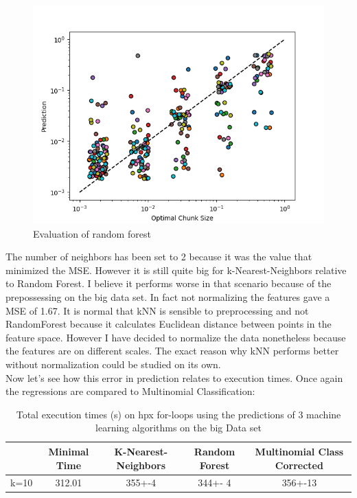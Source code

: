 \begin{figure}[H]
	\centering
	\includegraphics[width=120mm]{images/RFR_eval_big.png}
	\caption{Evaluation of random forest}
\end{figure}

The number of neighbors has been set to 2 because it was the value that minimized the MSE. However it is still quite big for k-Nearest-Neighbors relative to Random Forest. I believe it performs worse in that scenario because of the prepossessing on the big data set. In fact not normalizing the features gave a MSE of 1.67. It is normal that kNN is sensible to preprocessing and not RandomForest because it calculates Euclidean distance between points in the feature space. However I have decided to normalize the data nonetheless because the features are on different scales. The exact reason why kNN performs better without normalization could be studied on its own.
\\

Now let's see how this error in prediction relates to execution times. Once again the regressions are compared to Multinomial Classification:


\begin{table}[h]
	\centering
	\caption{Total execution times (s) on hpx for-loops using the predictions of 3 machine learning algorithms on the big Data set}
	\label{my-label}
	\begin{tabular}{|c|c|c|c|c|}
		\hline
		& Minimal Time&K-Nearest-Neighbors & Random Forest &Multinomial Class Corrected\\ \hline
		k=10  &312.01&
		 355+-4        & 344+- 4&356+-13 \\ \hline
	\end{tabular}
\end{table}

